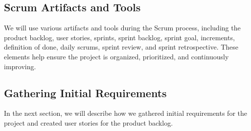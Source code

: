 \subsection*{Scrum Artifacts and Tools}
We will use various artifacts and tools during the Scrum process, including the product backlog, user stories, sprints, sprint backlog, sprint goal, increments, definition of done, daily scrums, sprint review, and sprint retrospective. These elements help ensure the project is organized, prioritized, and continuously improving.

\subsection*{Gathering Initial Requirements}
In the next section, we will describe how we gathered initial requirements for the project and created user stories for the product backlog.

